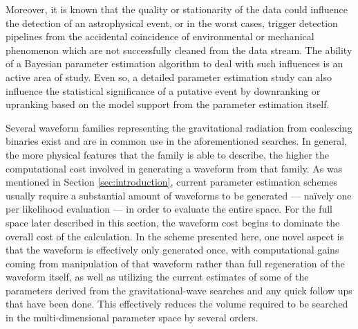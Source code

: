 Moreover, it is known\cite{glitch,detchar,glitch_pe} that the quality or stationarity of the data could influence the detection of an astrophysical event, or in the worst cases, trigger detection pipelines from the accidental coincidence of environmental or mechanical phenomenon which are not successfully cleaned from the data stream. The ability of a Bayesian parameter estimation algorithm to deal with such influences is an active area of study\cite{glitchfitting}. Even so, a detailed parameter estimation study can also influence the statistical significance of a putative event by downranking or upranking based on the model support from the parameter estimation itself.

Several waveform families representing the gravitational radiation from coalescing binaries exist and are in common use in the aforementioned searches\cite{waveforms}. In general, the more physical features that the family is able to describe, the higher the computational cost involved in generating a waveform from that family. As was mentioned in Section \ref{sec:introduction}, current parameter estimation schemes usually require a substantial amount of waveforms to be generated --- na\"ively one per likelihood evaluation --- in order to evaluate the entire space. For the full space later described in this section, the waveform cost begins to dominate the overall cost of the calculation. In the scheme presented here, one novel aspect is that the waveform is effectively only generated once, with computational gains coming from manipulation of that waveform rather than full regeneration of the waveform itself, as well as utilizing the current estimates of some of the parameters derived from the gravitational-wave searches and any quick follow ups that have been done. This effectively reduces the volume required to be searched in the multi-dimensional parameter space by several orders.
